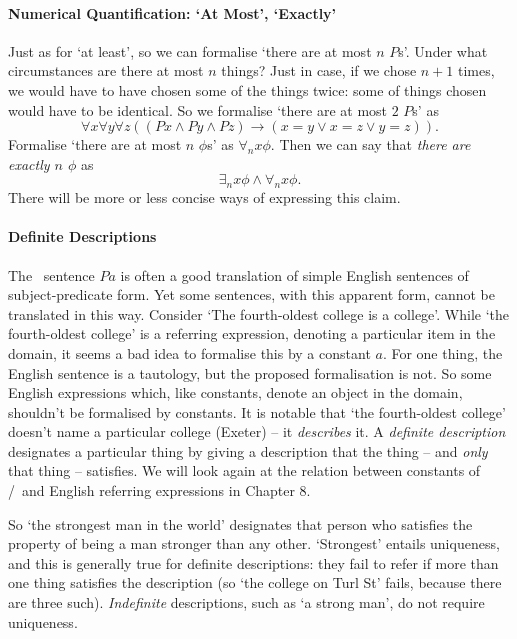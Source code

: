 \paragraph{Numerical Quantification: `At Most', `Exactly'}

Just as for `at least', so we can formalise `there are at most $n$ $P$s'. Under what circumstances are there at most $n$ things? Just in case, if we chose $n+1$ times, we would have to have chosen some of the things twice: some of things chosen would have to be identical.  So we formalise `there are at most $2$ $P$s' as \begin{equation*}\forall x \forall y \forall z ((Px \wedge Py \wedge Pz) \to (x=y \vee x=z \vee y=z)).
	\end{equation*}
Formalise `there are at most $n$ $\phi$s' as $\forall_{n} x \phi$. Then we can say that \emph{there are exactly $n$ $\phi$} as \begin{equation*}
	\exists_{n} x \phi \wedge \forall_{n} x \phi.
\end{equation*} There will be more or less concise ways of expressing this claim.

\paragraph{Definite Descriptions}

The \lequ\ sentence $Pa$ is often a good translation of simple English sentences of subject-predicate form. Yet some sentences, with this apparent form, cannot be translated in this way. Consider `The fourth-oldest college is a college'. While `the fourth-oldest college' is a referring expression, denoting a particular item in the domain, it seems a bad idea to formalise this by a constant $a$. For one thing, the English sentence is a tautology, but the proposed formalisation is not. So some English  expressions which, like constants, denote an object in the domain, shouldn't be formalised by constants. It is notable that `the fourth-oldest college' doesn't name a particular college (Exeter) – it \emph{describes} it. A \emph{definite description} designates a particular thing by giving a description that the thing – and \emph{only} that thing – satisfies. We will look again at the relation between constants of \ltwo/\lequ\ and English referring expressions in Chapter 8.

So `the strongest man in the world' designates that person who satisfies the property of being a man stronger than any other. `Strongest' entails uniqueness, and this is generally true for definite descriptions: they fail to refer if more than one thing satisfies the description (so `the college on Turl St' fails, because there are three such). \emph{Indefinite} descriptions, such as `a strong man', do not require uniqueness.


